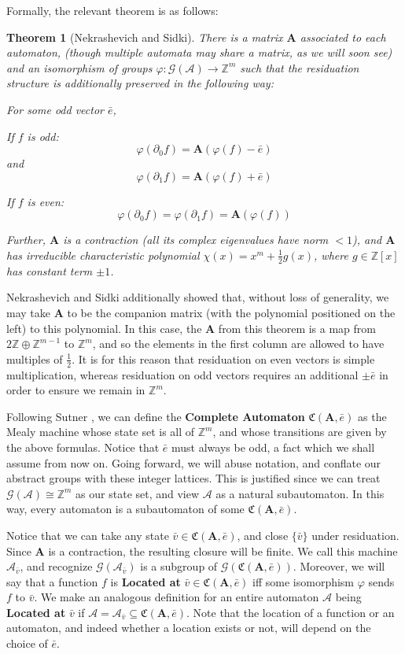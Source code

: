 \documentclass[12pt]{article}
\newcommand{\A}{\mathcal{A}}
\newcommand{\G}{\mathcal{G}}
\newcommand{\C}{\mathfrak{C}(\Am,\e)}
\newcommand{\Z}{\mathbb{Z}}
\newcommand{\2}{\textbf{2}}
\newcommand{\Am}{\textbf{A}}
\newcommand{\del}{\partial}
\renewcommand{\v}{\bar{v}}
\newcommand{\e}{\bar{e}}
\newtheorem{thm}{Theorem}
\begin{document}
Formally, the relevant theorem is as follows:
\begin{thm}[Nekrashevich and Sidki]
  There is a matrix $\Am$ associated to each automaton,
  (though multiple automata may share a matrix, as we will soon see)
  and an isomorphism of groups $\varphi : \G(\A) \to \Z^m$ such that
  the residuation structure is additionally preserved in the following way:

  For some odd vector $\e$,

  If $f$ is odd:
  \[ \varphi (\del_0 f) = \Am (\varphi(f) - \e) \] and
  \[ \varphi (\del_1 f) = \Am (\varphi(f) + \e) \]

  If $f$ is even:
  \[ \varphi (\del_0 f) = \varphi (\del_1 f) = \Am (\varphi(f)) \]

  Further, $\Am$ is a contraction (all its complex eigenvalues have norm $<1$),
  and $\Am$ has irreducible characteristic polynomial 
  $\chi(x) = x^m + \frac{1}{2}g(x)$, 
  where $g \in \Z[x]$ has constant term $\pm 1$.
\end{thm}

Nekrashevich and Sidki additionally showed that, without loss of generality, 
we may take $\Am$ to be the companion matrix 
(with the polynomial positioned on the left) 
to this polynomial. In this case, the $\Am$ from this theorem is a map from 
$2\Z \oplus \Z^{m-1}$ to $\Z^m$, and so the elements in the first column are
allowed to have multiples of $\frac{1}{2}$. It is for this reason that 
residuation on even vectors is simple multiplication, whereas residuation
on odd vectors requires an additional $\pm \e$ in order to ensure we
remain in $\Z^m$.

Following Sutner \cite{Sutner18:abelian_automata}, 
we can define the \textbf{Complete Automaton} 
$\C$ as the Mealy machine whose state set is all of
$\Z^m$, and whose transitions are given by the above formulas.
Notice that $\e$ must always be odd, a fact which we shall assume from now on.
Going forward, we will abuse notation, and conflate our abstract groups
with these integer lattices. This is justified since we can treat
$\G(\A) \cong \Z^m$ as our state set, and view $\A$ as a natural subautomaton. 
In this way, every automaton is a subautomaton of some $\C$.

Notice that we can take any state $\v \in \C$, 
and close $\{ \v \}$ under residuation.
Since $\Am$ is a contraction, the resulting closure will be finite.
We call this machine $\A_{\v}$, and recognize $\G(\A_{\v})$ is a subgroup of 
$\G(\C)$.
Moreover, we will say that a function $f$ is \textbf{Located at} 
$\v \in \C$ iff some isomorphism $\varphi$ sends 
$f$ to $\v$. We make an analogous definition for an entire automaton $\A$
being \textbf{Located at} $\v$ if 
$\A = \A_{\v} \subseteq \C$. Note that the location of a function or an
automaton, and indeed whether a location exists or not, 
will depend on the choice of $\e$.
\end{document}
